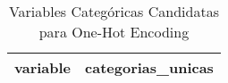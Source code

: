 \begin{table}[ht]
\centering
\begin{tabular}{lr}
  \toprule
variable & categorias\_unicas \\ 
  \midrule
 \bottomrule
\end{tabular}
\caption{Variables Categóricas Candidatas para One-Hot Encoding} 
\label{tab:variables_one_hot}
\end{table}
